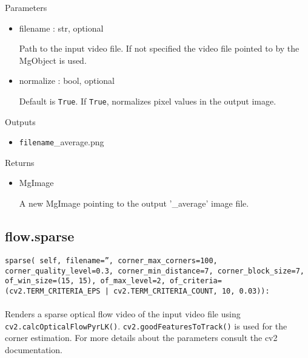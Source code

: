 \documentclass[9pt]{extarticle}
\def\code#1{\texttt{#1}}
\begin{document}
\noindent Parameters
\begin{itemize}
\item filename : str, optional

Path to the input video file. If not specified the video 
file pointed to by the MgObject is used.

\item normalize : bool, optional

Default is \code{True}. If \code{True}, normalizes pixel values in 
the output image.

\end{itemize}

\noindent Outputs
\begin{itemize}
\item \code{filename}\_average.png
\end{itemize}

\noindent Returns
\begin{itemize}
\item MgImage

A new MgImage pointing to the output '\_average' image file.
\end{itemize}


\subsection{flow.sparse}

\code{sparse(
    self,
    filename='',
    corner\_max\_corners=100,
    corner\_quality\_level=0.3,
    corner\_min\_distance=7,
    corner\_block\_size=7,
    of\_win\_size=(15, 15),
    of\_max\_level=2,
    of\_criteria=(cv2.TERM\_CRITERIA\_EPS | cv2.TERM\_CRITERIA\_COUNT, 10, 0.03)):}
\\\\
Renders a sparse optical flow video of the input video file 
using \code{cv2.calcOpticalFlowPyrLK()}. \code{cv2.goodFeaturesToTrack()} 
is used for the corner estimation. For more details about the parameters 
consult the cv2 documentation.
\\\\
\end{document}

